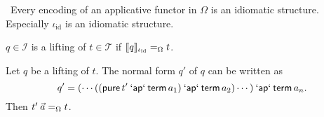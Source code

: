 \begin{lemma}
\todo\ Every encoding of an applicative functor in $\Omega$ is an idiomatic
structure.
Especially $\iota_\mathrm{id}$ is an idiomatic structure.
\end{lemma}

\begin{definition}
$q \in \mathcal{I}$ is a lifting of $t \in \mathcal{T}$ if 
$\llbracket q \rrbracket_{\iota_\mathrm{id}} =_\Omega t$.
\end{definition}

\begin{lemma}
Let $q$ be a lifting of $t$. The normal form $q'$ of $q$ can be written as
\[ q' = ( \cdots ((\operatorname{\mathsf{pure}} t' \mathbin{\mathsf{`ap`}} \operatorname{\mathsf{term}} a_1) \mathbin{\mathsf{`ap`}} \operatorname{\mathsf{term}} a_2) \cdots ) \mathbin{\mathsf{`ap`}} \operatorname{\mathsf{term}} a_n. \]
Then $t' \> \vec a =_\Omega t$.
\end{lemma}
\todo
